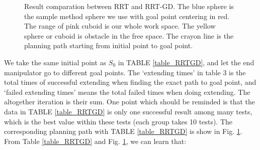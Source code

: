 \documentclass[letterpaper, 10 pt, conference]{ieeeconf}  %
\begin{document}
\begin{figure}[thpb]
      \centering

      \caption{Result comparation between RRT and RRT-GD. The blue sphere is the sample method sphere we use with goal point centering in red. The range of pink cuboid is our whole work space. The yellow sphere or cuboid is obstacle in the free space. The crayon line is the planning path starting from initial point to goal point. }
      \label{fig_final}
\end{figure}

We take the same initial point as $S_{0}$ in TABLE \ref{table_RRTGD}, and let the end manipulator go to different goal points. The `extending times' in table 3 is the total times of successful extending when finding the exact path to goal point, and `failed extending times' means the total failed times when doing extending. The altogether iteration is their sum. One point which should be reminded is that the data in TABLE \ref{table_RRTGD} is only one successful result among many tests, which is the best value within these tests (each group takes 10 tests). The corresponding planning path with TABLE \ref{table_RRTGD} is show in Fig. \ref{fig_final}. From Table \ref{table_RRTGD} and Fig. \ref{fig_final}, we can learn that:
\end{document}
